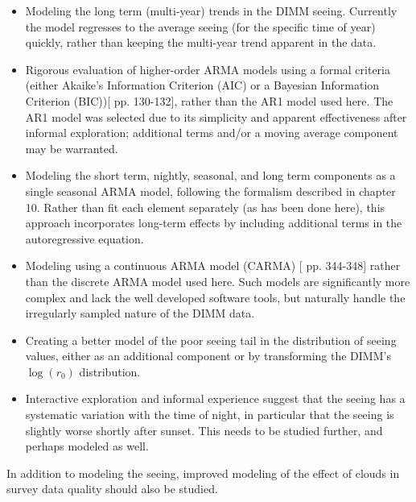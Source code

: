 \documentclass[\docopts]{\docclass}
\begin{document}
\begin{itemize}

\item Modeling the long term (multi-year) trends in the DIMM
  seeing. Currently the model regresses to the average seeing (for the
  specific time of year) quickly, rather than keeping the multi-year
  trend apparent in the data.

\item Rigorous evaluation of higher-order ARMA models using a formal
  criteria (either Akaike's Information Criterion (AIC) or a Bayesian
  Information Criterion (BIC))[\cite{cryer_time_2008} pp. 130-132],
  rather than the AR1 model used here. The AR1 model was selected due
  to its simplicity and apparent effectiveness after informal
  exploration; additional terms and/or a moving average component may
  be warranted.

\item Modeling the short term, nightly, seasonal, and long term
  components as a single seasonal ARMA model, following the formalism
  described in \cite{cryer_time_2008} chapter 10. Rather than fit each
  element separately (as has been done here), this approach
  incorporates long-term effects by including additional terms in the
  autoregressive equation.
  
\item Modeling using a continuous ARMA model (CARMA)
  [\cite{brockwell_introduction_1996} pp. 344-348] rather than the
  discrete ARMA model used here. Such models are significantly more
  complex and lack the well developed software tools, but naturally
  handle the irregularly sampled nature of the DIMM data.

\item Creating a better model of the poor seeing tail in the
  distribution of seeing values, either as an additional component or
  by transforming the DIMM's $\log(r_0)$ distribution.

\item Interactive exploration and informal experience suggest that the
  seeing has a systematic variation with the time of night, in
  particular that the seeing is slightly worse shortly after
  sunset. This needs to be studied further, and perhaps modeled as
  well.
  
\end{itemize}

In addition to modeling the seeing, improved modeling of the effect of
clouds in survey data quality should also be studied.
\end{document}
